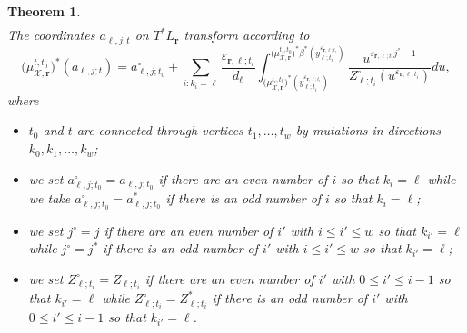 \documentclass{amsart}
\newtheorem{theorem}{Theorem}[section]
\numberwithin{equation}{section}
\newcommand{\bfr}{{\boldsymbol{r}}}
\newcommand{\cX}{\mathcal{X}}
\begin{document}
\begin{theorem}
\begin{align}
  \end{align}
  The coordinates $a_{\ell,j;t}$ on $T^*L_\bfr$ transform according to
  \begin{equation}
    \label{eq:catangent mutations}
    \big(\mu_{\cX,\bfr}^{t,t_0}\big)^*(a_{\ell,j;t})=a^\circ_{\ell,j;t_0}+\sum_{i:k_i=\ell} \frac{\varepsilon_{\bfr,\ell;t_i}}{d_\ell} \int_{\big(\mu_{\cX,\bfr}^{t_i,t_0}\big)^*(y_{\ell;t_i}^{\varepsilon_{\bfr,\ell;t_i}})}^{\big(\mu_{\cX,\bfr}^{t_i,t_0}\big)^*\beta^*(y_{\ell;t_i}^{\varepsilon_{\bfr,\ell;t_i}})} \frac{u^{\varepsilon_{\bfr,\ell;t_i} j^\circ-1}}{Z^\circ_{\ell;t_i}(u^{\varepsilon_{\bfr,\ell;t_i}})}du,
  \end{equation}
  where 
  \begin{itemize}
    \item $t_0$ and $t$ are connected through vertices $t_1,\ldots,t_w$ by mutations in directions $k_0,k_1,\ldots,k_w$;
    \item we set $a^\circ_{\ell,j;t_0}=a_{\ell,j;t_0}$ if there are an even number of $i$ so that $k_i=\ell$ while we take $a^\circ_{\ell,j;t_0}=a^*_{\ell,j;t_0}$ if there is an odd number of $i$ so that $k_i=\ell$;
    \item we set $j^\circ=j$ if there are an even number of $i'$ with $i\le i'\le w$ so that $k_{i'}=\ell$ while $j^\circ=j^*$ if there is an odd number of $i'$ with $i\le i'\le w$ so that $k_{i'}=\ell$;
    \item we set $Z^\circ_{\ell;t_i}=Z_{\ell;t_i}$ if there are an even number of $i'$ with $0\le i'\le i-1$ so that $k_{i'}=\ell$ while $Z^\circ_{\ell;t_i}=Z^*_{\ell;t_i}$ if there is an odd number of $i'$ with $0\le i'\le i-1$ so that $k_{i'}=\ell$.
  \end{itemize}
\end{theorem}
\end{document}
